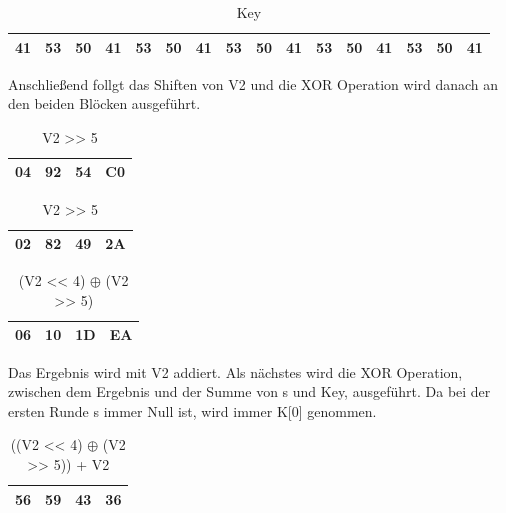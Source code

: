 \documentclass[course=asp]{aspdoc}
\begin{document}
\begin{table}[H]
\centering 
    \begin{tabular}{|l|l|l|l||l|l|l|l||l|l|l|l||l|l|l|l|}
        \hline
        41 & 53 & 50 & 41 & 53 & 50 & 41 & 53  & 50 & 41 & 53 & 50 & 41 & 53 & 50 & 41 \\
        \hline
    \end{tabular}
    \caption{Key}
\end{table}

 
Anschließend follgt das Shiften von V2 und die XOR Operation wird danach an den beiden Blöcken ausgeführt.
\begin{table}[H]
    
    \begin{minipage}{.5\linewidth}
      
      \centering
        \begin{tabular}{|l|l|l|l|}
		\hline
            04 & 92 & 54 & C0   \\
		\hline
        \end{tabular}

	\caption{V2 << 4}
    \end{minipage}%
    \begin{minipage}{.5\linewidth}
    
 \centering
        
        \begin{tabular}{|l|l|l|l|}
           \hline
		 02 & 82 & 49 & 2A   \\
		\hline
        \end{tabular}
\caption{V2 >> 5} 
    \end{minipage}
\end{table}

\begin{table}[H]
\centering 
    \begin{tabular}{|l|l|l|l|}
        \hline
        06 & 10 & 1D & EA    \\
        \hline
    \end{tabular}
    \caption{(V2 << 4) $\oplus$ (V2 >> 5)}
\end{table}
Das Ergebnis wird mit V2 addiert. Als nächstes wird die XOR Operation, zwischen dem Ergebnis und der Summe von s und Key, ausgeführt. Da bei der ersten Runde s immer Null ist, wird immer K[0] genommen. 
\begin{table}[H]
\centering 
    \begin{tabular}{|l|l|l|l|}
        \hline
        56 & 59 & 43 & 36    \\
        \hline
    \end{tabular}
    \caption{((V2 << 4) $\oplus$ (V2 >> 5)) + V2}
\end{table}
\end{document}
